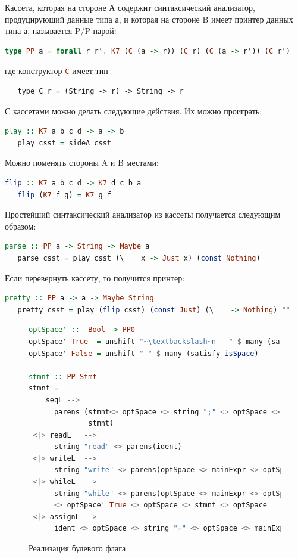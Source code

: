 Кассета, которая на стороне А содержит синтаксический анализатор, продуцирующий данные типа $а$, и которая
на стороне B имеет принтер данных типа $а$, называется P/P парой:

\begin{lstlisting}[mathescape,language=Haskell]
  type PP a = forall r r'. K7 (C (a -> r)) (C r) (C (a -> r')) (C r')
\end{lstlisting}

\noindent где конструктор \lstinline[language=Haskell]{C} имеет тип 

\begin{lstlisting}
   type C r = (String -> r) -> String -> r
\end{lstlisting}

С кассетами можно делать следующие действия. Их можно проиграть:

\begin{lstlisting}[mathescape,language=Haskell]
   play :: K7 a b c d -> a -> b
   play csst = sideA csst
\end{lstlisting}

Можно поменять стороны A и B местами:

\begin{lstlisting}[mathescape,language=Haskell]
   flip :: K7 a b c d -> K7 d c b a
   flip (K7 f g) = K7 g f
\end{lstlisting}

Простейший синтаксический анализатор из кассеты получается следующим образом:

\begin{lstlisting}[mathescape,language=Haskell]
   parse :: PP a -> String -> Maybe a
   parse csst = play csst (\_ _ x -> Just x) (const Nothing)
\end{lstlisting}

Если перевернуть кассету, то получится принтер:

\begin{lstlisting}[mathescape,language=Haskell]
   pretty :: PP a -> a -> Maybe String
   pretty csst = play (flip csst) (const Just) (\_ _ -> Nothing) ""
\end{lstlisting}

\begin{figure}[ht]
\centering
\begin{lstlisting}[language=Haskell]
optSpace' ::  Bool -> PP0
optSpace' True  = unshift "~\textbackslash~n   " $ many (satisfy isSpace)
optSpace' False = unshift " " $ many (satisfy isSpace)

stmnt :: PP Stmt
stmnt = 
    seqL -->
      parens (stmnt<> optSpace <> string ";" <> optSpace <> 
              stmnt)
 <|> readL   -->
      string "read" <> parens(ident)
 <|> writeL  -->
      string "write" <> parens(optSpace <> mainExpr <> optSpace)
 <|> whileL  -->
      string "while" <> parens(optSpace <> mainExpr <> optSpace) 
      <> optSpace' True <> optSpace <> stmnt <> optSpace 
 <|> assignL --> 
      ident <> optSpace <> string "=" <> optSpace <> mainExpr  
\end{lstlisting}
\caption{Реализация булевого флага}
\label{boolFlag2}
\end{figure}

